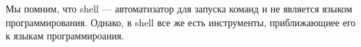 Мы помним, что shell --- автоматизатор для запуска команд и не является языком программирования. Однако, в shell все же есть инструменты, приближающиее его к языкам программироания.